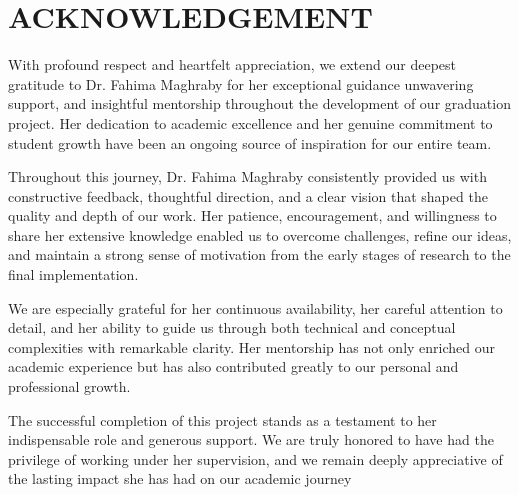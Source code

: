 \chapter*{ACKNOWLEDGEMENT}
\thispagestyle{plain}

\vspace{0.5cm}

 With profound respect and heartfelt appreciation, we extend our deepest gratitude to Dr. Fahima Maghraby for her exceptional guidance unwavering support, and insightful mentorship throughout the development of our graduation project. Her dedication to academic excellence and her genuine commitment to student growth have been an ongoing source of inspiration for our entire team.

  Throughout this journey, Dr. Fahima Maghraby consistently provided us with constructive feedback, thoughtful direction, and a clear vision that shaped the quality and depth of our work. Her patience, encouragement, and willingness to share her extensive knowledge enabled us to overcome challenges, refine our ideas, and maintain a strong sense of motivation from the early stages of research to the final implementation.

  We are especially grateful for her continuous availability, her careful attention to detail, and her ability to guide us through both technical and conceptual complexities with remarkable clarity. Her mentorship has not only enriched our academic experience but has also contributed greatly to our personal and professional growth.

  The successful completion of this project stands as a testament to her indispensable role and generous support. We are truly honored to have had the privilege of working under her supervision, and we remain deeply appreciative of the lasting impact she has had on our academic journey



\clearpage

